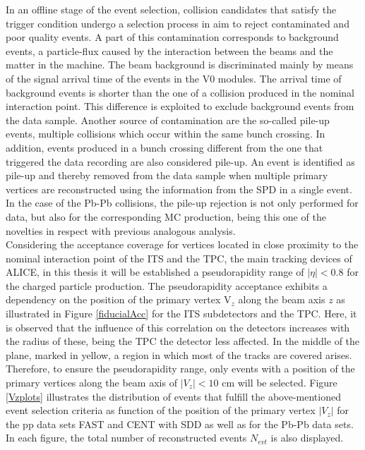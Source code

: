 \documentclass[12pt,a4paper]{report}
\begin{document}
In an offline stage of the event selection, collision candidates that satisfy the trigger condition undergo a selection process in aim to reject contaminated and poor quality events. A part of this contamination corresponds to background events, a particle-flux caused by the interaction between the beams and the matter in the machine. The beam background is discriminated mainly by means of the signal arrival time of the events in the V0 modules. The arrival time of background events is shorter than the one of a collision produced in the nominal interaction point. This difference is exploited to exclude background events from the data sample. Another source of contamination are the so-called pile-up events, multiple collisions which occur within the same bunch crossing. In addition, events produced in a bunch crossing different from the one that triggered the data recording are also considered pile-up. An event is identified as pile-up and thereby removed from the data sample when multiple primary vertices are reconstructed using the information from the SPD in a single event. In the case of the Pb-Pb collisions, the pile-up rejection is not only performed for data, but also for the corresponding MC production, being this one of the novelties in respect with previous analogous analysis. \\
Considering the acceptance coverage for vertices located in close proximity to the nominal interaction point of the ITS and the TPC, the main tracking devices of ALICE, in this thesis it will be established a pseudorapidity range of $|\eta| < 0.8$ for the charged particle production. The pseudorapidity acceptance exhibits a dependency on the position of the primary vertex $\text{V}_z$ along the beam axis $z$ as illustrated in Figure \ref{fiducialAcc} for the ITS subdetectors and the TPC. Here, it is observed that the influence of this correlation on the detectors increases with the radius of these, being the TPC the detector less affected. In the middle of the plane, marked in yellow, a region in which most of the tracks are covered arises. Therefore, to ensure the pseudorapidity range, only events with a position of the primary vertices along the beam axis of $|V_z| < 10$ cm will be selected. Figure \ref{Vzplots} illustrates the distribution of events that fulfill the above-mentioned event selection criteria as function of the position of the primary vertex $|V_z|$ for the pp data sets FAST and CENT with SDD as well as for the Pb-Pb data sets. In each figure, the total number of reconstructed events $N_{evt}$ is also displayed.
\end{document}
